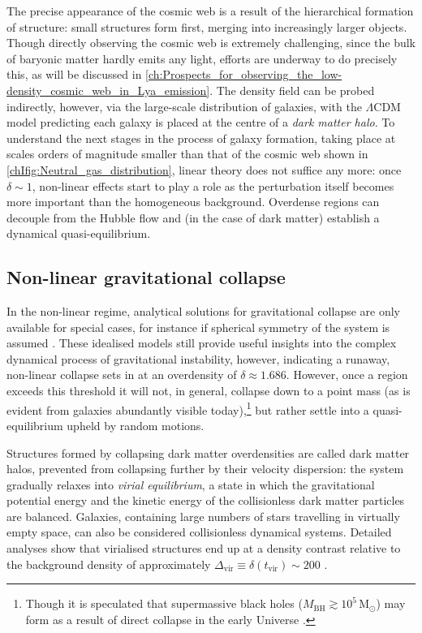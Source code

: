 The precise appearance of the cosmic web is a result of the hierarchical formation of structure: small structures form first, merging into increasingly larger objects. Though directly observing the cosmic web is extremely challenging, since the bulk of baryonic matter hardly emits any light, efforts are underway to do precisely this, as will be discussed in \cref{ch:Prospects_for_observing_the_low-density_cosmic_web_in_Lya_emission}. The density field can be probed indirectly, however, via the large-scale distribution of galaxies, with the $\Lambda$CDM model predicting each galaxy is placed at the centre of a \textit{dark matter halo}. To understand the next stages in the process of galaxy formation, taking place at scales orders of magnitude smaller than that of the cosmic web shown in \cref{chIfig:Neutral_gas_distribution}, linear theory does not suffice any more: once $\delta \sim 1$, non-linear effects start to play a role as the perturbation itself becomes more important than the homogeneous background. Overdense regions can decouple from the Hubble flow and (in the case of dark matter) establish a dynamical quasi-equilibrium.

\subsection{Non-linear gravitational collapse}
\label{chIssec:Non-linear_collapse}

In the non-linear regime, analytical solutions for gravitational collapse are only available for special cases, for instance if spherical symmetry of the system is assumed \citep[e.g.][]{1972ApJ...176....1G}. These idealised models still provide useful insights into the complex dynamical process of gravitational instability, however, indicating a runaway, non-linear collapse sets in at an overdensity of $\delta \approx 1.686$. However, once a region exceeds this threshold it will not, in general, collapse down to a point mass (as is evident from galaxies abundantly visible today),\footnote{Though it is speculated that supermassive black holes ($M_\text{BH} \gtrsim 10^5 \, \mathrm{M_\odot}$) may form as a result of direct collapse in the early Universe \citep[e.g.][]{2003ApJ...596...34B}.} but rather settle into a quasi-equilibrium upheld by random motions.

Structures formed by collapsing dark matter overdensities are called dark matter halos, prevented from collapsing further by their velocity dispersion: the system gradually relaxes into \textit{virial equilibrium}, a state in which the gravitational potential energy and the kinetic energy of the collisionless dark matter particles are balanced. Galaxies, containing large numbers of stars travelling in virtually empty space, can also be considered collisionless dynamical systems. Detailed analyses show that virialised structures end up at a density contrast relative to the background density of approximately $\Delta_\text{vir} \equiv \delta (t_\text{vir}) \sim 200$ \citep{1998ApJ...495...80B}.

